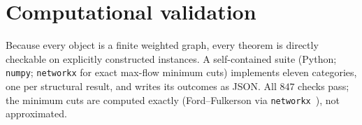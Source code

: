 \documentclass[11pt,twocolumn,a4paper]{article}
\theoremstyle{thmstyle}
\theoremstyle{definition}
\theoremstyle{remark}
\begin{document}
\section{Computational validation}
\label{sec:validation}

Because every object is a finite weighted graph, every theorem is directly
checkable on explicitly constructed instances. A self-contained suite
(Python; \texttt{numpy}; \texttt{networkx} for exact max-flow minimum
cuts) implements eleven categories, one per structural result, and writes
its outcomes as JSON. All $847$ checks pass; the minimum cuts are computed
exactly (Ford--Fulkerson via \texttt{networkx}~\citep{fordfulkerson1956}),
not approximated.
\end{document}
